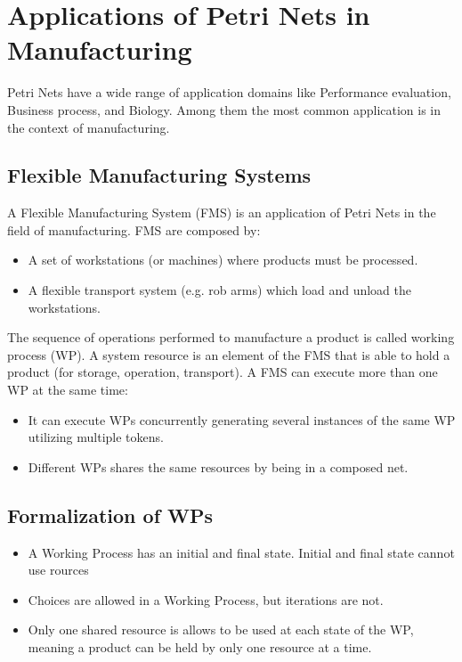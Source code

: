 \chapter{Applications of Petri Nets in Manufacturing}

Petri Nets have a wide range of application domains like Performance evaluation, Business process, and Biology. Among them the most common application is in the context of manufacturing. 

\section{Flexible Manufacturing Systems}
A Flexible Manufacturing System (FMS) is an application of Petri Nets in the field of manufacturing. FMS are composed by:

\begin{itemize}
    \item A set of workstations (or machines) where products must be processed.
    \item A flexible transport system (e.g. rob arms) which load and unload the workstations.
\end{itemize}

The sequence of operations performed to manufacture a product is called working process (WP). A system resource is an element of the FMS that is able to hold a product (for storage, operation, transport). A FMS can execute more than one WP at the same time:
\begin{itemize}
    \item It can execute WPs concurrently generating several instances of the same WP utilizing multiple tokens.
    \item Different WPs shares the same resources by being in a composed net.
\end{itemize}

\section{Formalization of WPs}
\begin{itemize}
    \item A Working Process has an initial and final state. Initial and final state cannot use rources
    \item Choices are allowed in a Working Process, but iterations are not.
    \item Only one shared resource is allows to be used at each state of the WP, meaning a product can be held by only one resource at a time.
\end{itemize}


